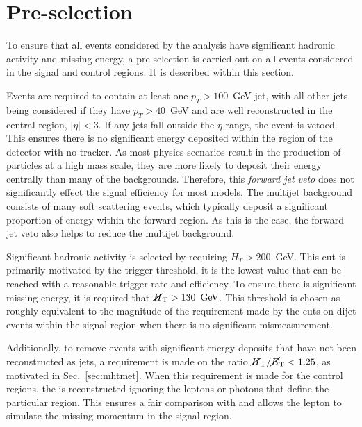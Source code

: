 \section{Pre-selection}%
\label{sec:preselection}

To ensure that all events considered by the analysis have
significant hadronic activity and missing energy, a pre-selection is
carried out on all events considered in the signal and control
regions. It is described within this section.

Events are required to contain at least one $p_T>100$~GeV jet, with
all other jets being considered if they have $p_T>40$~GeV and are well
reconstructed in the central region, $|\eta|<3$. If any jets fall
outside the $\eta$ range, the event is vetoed. This ensures there is
no significant energy deposited within the region of the detector with
no tracker. As most \BSM physics scenarios result in the production of
particles at a high mass scale, they are more likely to deposit their
energy centrally than many of the \SM backgrounds. Therefore, this
\emph{forward jet veto} does not significantly effect the signal
efficiency for most models. The \QCD multijet background consists of
many soft scattering events, which typically deposit a significant
proportion of energy within the forward region. As this is the case,
the forward jet veto also helps to reduce the multijet background.

Significant hadronic activity is selected by requiring $H_T>200$~GeV.
This cut is primarily motivated by the trigger threshold, it is the
lowest \HT value that can be reached with a reasonable trigger rate
and efficiency. To ensure there is significant missing energy, it is
required that $\mbox{$\cancel{H}_\text{T}$}>130~\mathrm{\,Ge\kern -0.1em V}$.  This threshold is chosen as roughly
equivalent to the magnitude of the \MHT requirement made by the
\alphat cuts on dijet events within the signal region when there is no
significant mismeasurement. 

Additionally, to remove events with significant energy deposits that
have not been reconstructed as jets, a requirement is made on the
ratio $\mbox{$\mbox{$\cancel{H}_\text{T}$} / \mbox{$\cancel{E}_\text{T}$}$}<1.25$, as motivated in Sec.~\ref{sec:mhtmet}.  When
this requirement is made for the control regions, the \MET is
reconstructed ignoring the leptons or photons that define the
particular region. This ensures a fair comparison with \MHT and allows
the lepton to simulate the missing momentum in the 
signal region.

